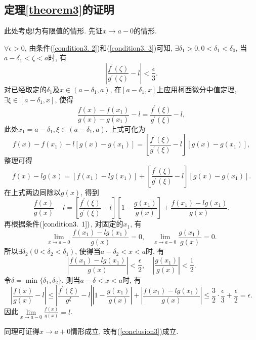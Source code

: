 \documentclass{ctexart}
\begin{document}
\subsection{定理\ref{theorem3}的证明}
此处考虑$l$为有限值的情形. 先证$x\rightarrow a-0$的情形.
\par$\forall\epsilon>0$, 由条件(\ref{condition3. 2})和(\ref{condition3. 3})可知, $\exists \delta_1>0, 0<\delta_1<\delta_0$, 当$a-\delta_1<\zeta<a$时, 有
\begin{equation}\label{eq3. 1}
    |\frac{f^{'}(\zeta)}{g^{'}(\zeta)}-l|<\frac{\epsilon}{3}.
\end{equation}
对已经取定的$\delta_1$及$x\in (a-\delta_1, a)$, 在$[a-\delta_1, x]$上应用柯西微分中值定理, $\exists \xi\in[a-\delta_1, x]$, 使得
\begin{equation}\label{eq3. 2}
    \frac{f(x)-f(x_1)}{g(x)-g(x_1)}-l=\frac{f^{'}(\xi)}{g^{'}(\xi)}-l, 
\end{equation}
此处$x_1=a-\delta_1, \xi\in(a-\delta_1, a)$. 上式可化为
\begin{equation}\label{eq3. 3}
    f(x)-f(x_1)-l[g(x)-g(x_1)]=[\frac{f^{'}(\xi)}{g^{'}(\xi)}-l][g(x)-g(x_1)], 
\end{equation}
整理可得
\begin{equation}\label{eq3. 4}
    f(x)-lg(x)=[f(x_1)-lg(x_1)]+[\frac{f^{'}(\xi)}{g^{'}(\xi)}-l][g(x)-g(x_1)].
\end{equation}
在上式两边同除以$g(x)$, 得到
\begin{equation}\label{eq3. 5}
    \frac{f(x)}{g(x)}-l=[\frac{f^{'}(\xi)}{g^{'}(\xi)}-l][1-\frac{g(x_1)}{g(x)}]+\frac{f(x_1)-lg(x_1)}{g(x)}.
\end{equation}
再根据条件($\ref{condition3. 1})$, 对固定的$x_1$, 有
\begin{equation}\label{eq3. 6}
    \lim_{x\rightarrow a-0}\frac{f(x_1)-lg(x_1)}{g(x)}=0, \quad\lim_{x\rightarrow a-0}\frac{g(x_1)}{g(x)}=0.
\end{equation}
所以$\exists \delta_2(0<\delta_2<\delta_1)$, 使得当$a-\delta_2<x<a$时, 有
\begin{equation}\label{eq3. 7}
    |\frac{f(x_1)-lg(x_1)}{g(x)}|<\frac{\epsilon}{2}, \quad|\frac{g(x_1)}{g(x)}|<\frac{1}{2}.
\end{equation}
令$\delta=\min\{\delta_1, \delta_2\}$, 则当$a-\delta<x<a$时, 有
\begin{equation}
    |\frac{f(x)}{g(x)}-l|\leq|\frac{f^{'}(\xi)}{g^{\xi}}-l||1-\frac{g(x_1)}{g(x)}|+|\frac{f(x_1)-lg(x_1)}{g(x)}|\leq \frac{3}{2}\cdot\frac{\epsilon}{3}+\frac{\epsilon}{2}=\epsilon. 
\end{equation}
因此$\lim\limits_{x\rightarrow a-0}\frac{f(x)}{g(x)}=l$.
\par 同理可证得$x\rightarrow a+0$情形成立, 故有(\ref{conclusion3})成立.
\end{document}
